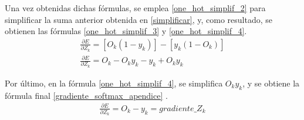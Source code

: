 Una vez obtenidas dichas fórmulas, se emplea \ref{one_hot_simplif_2} para simplificar la suma anterior obtenida en \ref{simplificar}, y, como resultado, se obtienen las fórmulas \ref{one_hot_simplif_3} y \ref{one_hot_simplif_4}. \\


\begin{gather}
	\frac{\partial E}{\partial Z_k} = [O_k (1-y_k)] - [y_k (1-O_k)] \label{one_hot_simplif_3} \\
	\frac{\partial E}{\partial Z_k} = O_k - O_k   y_k - y_k + O_k   y_k  \label{one_hot_simplif_4}
\end{gather}

Por último, en la fórmula \ref{one_hot_simplif_4}, se simplifica $O_k y_k$, y se obtiene la fórmula final \ref{gradiente_softmax_apendice} \cite{Cross_entropy_backprop} \cite{Cross_entropy_backprop_grad_input}. \\
\begin{gather}
	\frac{\partial E}{\partial Z_k} = O_k - y_k = gradiente\_Z_k
	\label{gradiente_softmax_apendice}
\end{gather} 
